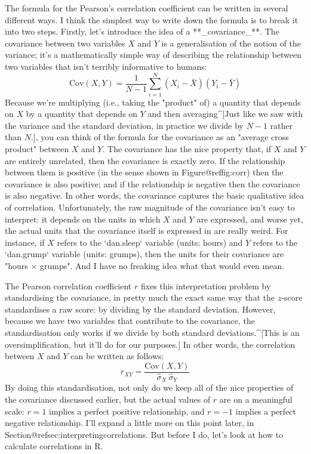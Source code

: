 The formula for the Pearson's correlation coefficient can be written in several different ways. I think the simplest way to write down the formula is to break it into two steps. Firstly, let's introduce the idea of a **_covariance_**. The covariance between two variables $X$ and $Y$ is a generalisation of the notion of the variance; it's a mathematically simple way of describing the relationship between two variables that isn't terribly informative to humans:
$$
\mbox{Cov}(X,Y) = \frac{1}{N-1} \sum_{i=1}^N \left( X_i - \bar{X} \right) \left( Y_i - \bar{Y} \right)
$$
Because we're multiplying (i.e., taking the "product" of) a quantity that depends on $X$ by a quantity that depends on $Y$ and then averaging^[Just like we saw with the variance and the standard deviation, in practice we divide by $N-1$ rather than $N$.], you can think of the formula for the covariance as an "average cross product" between $X$ and $Y$. The covariance has the nice property that, if $X$ and $Y$ are entirely unrelated, then the covariance is exactly zero. If the relationship between them is positive (in the sense shown in Figure@reffig:corr) then the covariance is also positive; and if the relationship is negative then the covariance is also negative. In other words, the covariance captures the basic qualitative idea of correlation. Unfortunately, the raw magnitude of the covariance isn't easy to interpret: it depends on the units in which $X$ and $Y$ are expressed, and worse yet, the actual units that the covariance itself is expressed in are really weird. For instance, if $X$ refers to the `dan.sleep` variable (units: hours) and $Y$ refers to the `dan.grump` variable (units: grumps), then the units for their covariance are "hours $\times$ grumps". And I have no freaking idea what that would even mean. 

The Pearson correlation coefficient $r$ fixes this interpretation problem by standardising the covariance, in pretty much the exact same way that the $z$-score standardises a raw score: by dividing by the standard deviation. However, because we have two variables that contribute to the covariance, the standardisation only works if we divide by both standard deviations.^[This is an oversimplification, but it'll do for our purposes.]  In other words, the correlation between $X$ and $Y$ can be written as follows:
$$
r_{XY}  = \frac{\mbox{Cov}(X,Y)}{ \hat{\sigma}_X \ \hat{\sigma}_Y}
$$
By doing this standardisation, not only do we keep all of the nice properties of the covariance discussed earlier, but the actual values of $r$ are on a meaningful scale: $r= 1$ implies a perfect positive relationship, and $r = -1$ implies a perfect negative relationship. I'll expand a little more on this point later, in Section@refsec:interpretingcorrelations. But before I do, let's look at how to calculate correlations in R.




